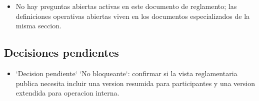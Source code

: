\begin{itemize}
  \item No hay preguntas abiertas activas en este documento de reglamento; las definiciones operativas abiertas viven en los documentos especializados de la misma seccion.
\end{itemize}

\subsection{Decisiones pendientes}

\begin{itemize}
  \item `Decision pendiente` `No bloqueante`: confirmar si la vista reglamentaria publica necesita incluir una version resumida para participantes y una version extendida para operacion interna.
\end{itemize}
